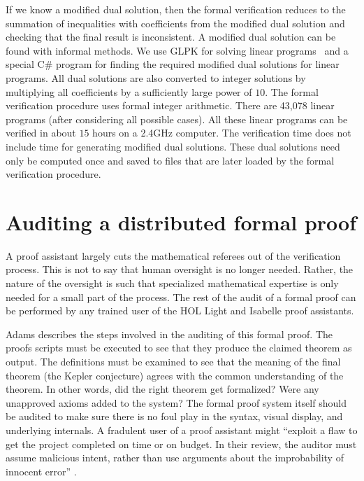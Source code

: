 If we know a modified dual solution, then the formal verification
reduces to the summation of inequalities with coefficients from the
modified dual solution and checking that the final result is
inconsistent. A modified dual solution can be found with informal
methods. We use GLPK for solving linear programs~\cite{website:GLPK}
and a special C\# program for finding the required modified dual
solutions for linear programs. All dual solutions are also converted
to integer solutions by multiplying all coefficients by a sufficiently
large power of $10$. The formal verification procedure uses formal
integer arithmetic. There are 43,078 linear programs (after
considering all possible cases). All these linear programs can be
verified in about $15$ hours on a 2.4GHz computer. The verification
time does not include time for generating modified dual
solutions. These dual solutions need only be computed once and saved
to files that are later loaded by the formal verification procedure.


\section{Auditing a distributed formal proof}

A proof assistant largely cuts the mathematical referees out of the
verification process.  This is not to say that human oversight is no
longer needed.  Rather, the nature of the oversight is such that
specialized mathematical expertise is only needed for a small
part of the process.  The rest of the audit of a formal proof can be
performed by any trained user of the HOL Light and Isabelle proof
assistants.

Adams \cite{adams2014flyspecking} describes the steps involved in the
auditing of this formal proof.  The proofs scripts must be executed to
see that they produce the claimed theorem as output.  The definitions
must be examined to see that the meaning of the final theorem (the
Kepler conjecture) agrees with the common understanding of the
theorem.  In other words, did the right theorem get formalized?  Were
any unapproved axioms added to the system?  The formal proof system
itself should be audited to make sure there is no foul play in the
syntax, visual display, and underlying internals.  A fradulent user of
a proof assistant might ``exploit a flaw to get the project completed
on time or on budget.  In their review, the auditor must assume
malicious intent, rather than use arguments about the improbability of
innocent error'' \cite{adams2014flyspecking}.

